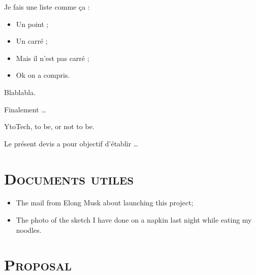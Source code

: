 \documentclass[10pt, a4paper]{article}
\begin{document}
    Je fais une liste comme ça :

    \begin{itemize}
      \item Un point ;
      \item Un carré ;
      \item Mais il n'est pas carré ;
      \item Ok on a compris.
    \end{itemize}\bigskip

    Blablabla.

    Finalement \ldots{}

    YtoTech, to be, or not to be.

    Le présent devis a pour objectif d'établir \ldots{}
    \section*{\textsc{Documents utiles}}
    \begin{itemize}
      \item The mail from Elong Musk about launching this project;
      \item The photo of the sketch I have done on a napkin last night while eating my noodles.
    \end{itemize}


\normalsize \sffamily
\section*{\textsc{Proposal}}
\footnotesize
{}
\setcounter{pos}{0}
\end{document}
